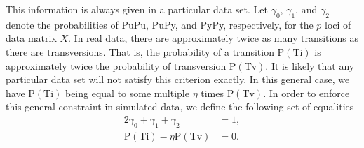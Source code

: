 \documentclass[10pt,letterpaper]{article}\usepackage[]{graphicx}\usepackage[]{color}
\begin{document}
\begin{minipage}[c]{0.62\textwidth}\hspace{-0.5cm}
\end{minipage}\hspace{-0.3cm}
\begin{minipage}[c]{0.35\textwidth}
    \label{fig:TiTv_diagram}
\end{minipage}

\bigskip

This information is always given in a particular data set. Let $\gamma_0$, $\gamma_1$, and $\gamma_2$ denote the probabilities of PuPu, PuPy, and PyPy, respectively, for the $p$ loci of data matrix $X$. In real data, there are approximately twice as many transitions as there are transversions. That is, the probability of a transition $\text{P}(\text{Ti})$ is approximately twice the probability of transversion $\text{P}(\text{Tv})$. It is likely that any particular data set will not satisfy this criterion exactly. In this general case, we have $\text{P}(\text{Ti})$ being equal to some multiple $\eta$ times $\text{P}(\text{Tv})$. In order to enforce this general constraint in simulated data, we define the following set of equalities
%
\begin{alignat}{2}\label{eq:TiTv_constraints1}
\gamma_0 + \gamma_1 + \gamma_2 &= 1, \\ \label{eq:TiTv_constraints2}
\text{P}(\text{Ti}) - \eta \text{P}(\text{Tv}) &= 0.
\end{alignat}
\end{document}

